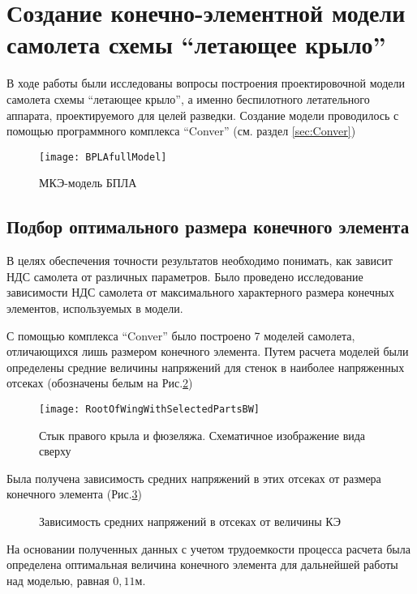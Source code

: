 \section{Создание конечно-элементной модели самолета схемы ``летающее крыло''}

В ходе работы были исследованы вопросы построения проектировочной модели самолета схемы ``летающее крыло'', а именно беспилотного летательного аппарата, проектируемого для целей разведки. Создание модели проводилось с помощью программного комплекса ``Conver'' (см. раздел \ref{sec:Conver})

\begin{figure}[ht]
\centering
\texttt{[image: BPLAfullModel]}
\caption{МКЭ-модель БПЛА}
\label{fig:BPLAfullModel}
\end{figure}

\subsection{Подбор оптимального размера конечного элемента}

В целях обеспечения точности результатов необходимо понимать, как зависит НДС самолета от различных параметров. Было проведено исследование зависимости НДС самолета от максимального характерного размера конечных элементов, используемых в модели. 

С помощью комплекса ``Conver'' было построено 7 моделей самолета, отличающихся лишь размером конечного элемента. Путем расчета моделей были определены средние величины напряжений для стенок в наиболее напряженных отсеках (обозначены белым на  Рис.\ref{fig:WingRootPlain})

\begin{figure}[ht]
\centering
\texttt{[image: RootOfWingWithSelectedPartsBW]}
\caption{Стык правого крыла и фюзеляжа. Схематичное изображение вида сверху}
\label{fig:WingRootPlain}
\end{figure}




Была получена зависимость средних напряжений в этих отсеках от размера конечного элемента (Рис.\ref{fig:stressToDiscreteness})
\begin{figure}[ht]
\centering

\caption{Зависимость средних напряжений в отсеках от величины КЭ}
\label{fig:stressToDiscreteness}
\end{figure}

На основании полученных данных с учетом трудоемкости процесса расчета была определена оптимальная величина конечного элемента для дальнейшей работы над моделью, равная $0,11\text{м}$. 
